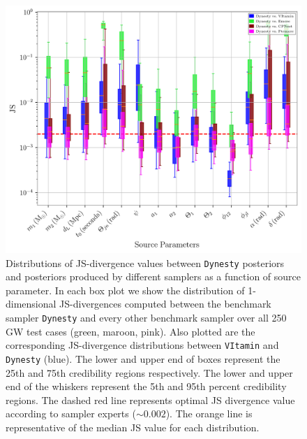 \documentclass[%
showpacs,
nofootinbib,
 amsmath,amssymb,
 aps,
 twocolumn,
 prl,
 reprint,
floatfix,
]{revtex4-1}
\begin{document}
%
\begin{figure}
    \includegraphics[width=\textwidth]{JS_IndiPar_dynesty.png}
    \caption{\label{fig:kl_results} Distributions of \ac{JS}-divergence values between 
    \texttt{Dynesty} posteriors and posteriors produced by different samplers 
    as a function 
    of source parameter. In each box plot we show the distribution of 1-dimensional 
     \ac{JS}-divergences computed between the benchmark sampler \texttt{Dynesty} 
     and every other benchmark sampler over all 250 \ac{GW} test cases 
     (green, maroon, pink). Also plotted are the corresponding 
     \ac{JS}-divergence distributions between \texttt{VItamin} and \texttt{Dynesty} 
     (blue). The lower and upper end of boxes represent the 25th and 75th credibility
      regions respectively. The lower and upper end of the whiskers represent the 5th 
      and 95th percent credibility regions. The dashed red line represents optimal JS divergence value according to sampler experts ($\sim 0.002$). 
      The orange line is representative of the median JS value for each distribution. 
      }

\end{figure}
%
\end{document}
